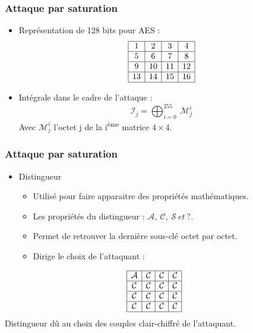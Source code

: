 \documentclass{beamer}
\begin{document}
	\begin{frame}
		\frametitle{Attaque par saturation}
		 \begin{itemize}
			\item Représentation de 128 bits pour AES :
			$$
			\begin{array}{|c|c|c|c|}
				\hline
				1 & 2 & 3 & 4 \\
				\hline
				5 & 6 & 7 & 8 \\
				\hline
				9 & 10 & 11 & 12 \\
				\hline
				13 & 14 & 15 & 16 \\
				\hline
			\end{array}
			$$
			\item Intégrale dans le cadre de l'attaque : 
			$$
			\mathcal{I}_j = \bigoplus_{i=0}^{255}\ \mathcal{M}_{j}^{i}
			$$
			Avec $\mathcal{M}_{j}^{i}$ l'octet j de la i\textsuperscript{ème} matrice $4 \times 4$.
		 \end{itemize}
	\end{frame}

	\begin{frame}
		\frametitle{Attaque par saturation}
		\begin{itemize}
			\item Distingueur
			\begin{itemize}
				\item Utilisé pour faire apparaitre des propriétés mathématiques.
				\item Les propriétés du distingueur : $\mathcal{A},\ \mathcal{C},\ \mathcal{S}\ et\ ?.$
    			\item Permet de retrouver la dernière sous-clé octet par octet.
       			\item Dirige le choix de l'attaquant :
			\end{itemize}
		\end{itemize}
		\vspace{0.5 cm}
			$$
			\begin{array}{|c|c|c|c|}
				\hline
				\mathcal{A} & \mathcal{C} & \mathcal{C} & \mathcal{C} \\
				\hline
				\mathcal{C} & \mathcal{C} & \mathcal{C} & \mathcal{C} \\
				\hline
				\mathcal{C} & \mathcal{C} & \mathcal{C} & \mathcal{C} \\
				\hline
				\mathcal{C} & \mathcal{C} & \mathcal{C} & \mathcal{C} \\
				\hline
			\end{array}
			$$
			\vspace{0.5 cm}
			Distingueur dû au choix des couples clair-chiffré de l'attaquant.
	\end{frame}
\end{document}

